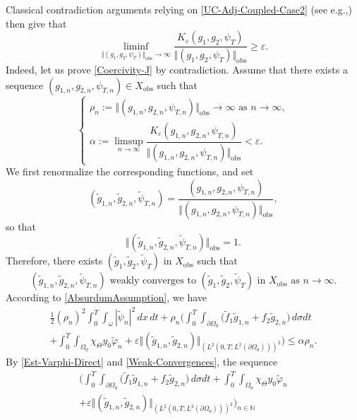 \documentclass[11pt]{article}
\newcommand{\eg}{e.g.,\xspace}
\numberwithin{equation}{section}
\newcommand{\obs}{\mathrm{obs}}
\newcommand\N{{\mathbb N}}
\newcommand{\norm}[1]{\Vert#1\Vert}
\theoremstyle{definition}
\begin{document}
Classical contradiction arguments relying on \eqref{UC-Adj-Coupled-Case2} (see \eg \cite{Ervedoza-Note-2020}) then give that
\begin{equation}
\label{Coercivity-J}
\liminf_{\norm{(g_1, g_2, \psi_T)}_{\obs} \to \infty} \frac{K_\varepsilon(g_1, g_2, \psi_T) }{\norm{(g_1, g_2, \psi_T)}_{\obs}} \geq \varepsilon.
\end{equation}
Indeed, let us prove \eqref{Coercivity-J} by contradiction. Assume that there exists a sequence $(g_{1,n}, g_{2,n}, \psi_{T,n}) \in X_{\obs}$ such that
\begin{equation}
\label{AbsurdumAssumption}
\begin{cases}
\rho_n := \norm{(g_{1,n}, g_{2,n}, \psi_{T,n})}_{\obs} \to \infty \text{ as } n \to \infty,\\[3pt]
\alpha:=\limsup_{n \to \infty} \dfrac{K_\varepsilon(g_{1,n}, g_{2,n}, \psi_{T,n})}{\norm{(g_{1,n}, g_{2,n}, \psi_{T,n})}_{\obs}} < \varepsilon.
\end{cases}
\end{equation}
We first renormalize the corresponding functions, and set
\[
(\tilde g_{1,n}, \tilde g_{2,n}, \tilde \psi_{T,n}) = \frac{(g_{1,n}, g_{2,n}, \psi_{T,n})}{ \norm{(g_{1,n}, g_{2,n}, \psi_{T,n})}_{\obs}},
\]
so that
\begin{equation}
\label{Bound-tilde-n}
\norm{(\tilde g_{1,n}, \tilde g_{2,n}, \tilde \psi_{T,n}) }_{\obs} = 1.
\end{equation}
Therefore, there exists $(\tilde g_1, \tilde g_2, \tilde \psi_T)$ in $X_{\obs}$ such that
\begin{equation}
\label{Weak-Convergences}
(\tilde g_{1,n}, \tilde g_{2,n}, \tilde \psi_{T,n}) \text{ weakly converges to }(\tilde g_1, \tilde g_2, \tilde \psi_T) \text{ in } X_{\obs} \text{ as } n \to \infty.
\end{equation}
According to \eqref{AbsurdumAssumption}, we have
\begin{multline}
\label{J-eps-expanded}
\frac{1}{2}(\rho_n)^2 \int_0^T \int_\omega |\tilde \psi_n|^2 \, dx\,dt
+
\rho_n
\biggl(
\int_0^T \int_{\partial \Omega_0} \bigl(\tilde f_1 \tilde g_{1,n} + f_2 \tilde g_{2,n} \bigr) \, d\sigma dt\\
+
\int_0^T \int_{\Omega_0} \chi_{\Theta} y_0 \tilde \varphi_n
+
\varepsilon { \norm{(\tilde g_{1,n}, \tilde g_{2,n})}_{(L^2(0,T; L^2(\partial\Omega_0)))^2}
}
\biggr)
\leq \alpha \rho_n.
\end{multline}
By \eqref{Est-Varphi-Direct} and \eqref{Weak-Convergences}, the sequence
\begin{multline*}
\biggl(
\int_0^T \int_{\partial \Omega_0} \bigl(\tilde f_1 \tilde g_{1,n} + f_2 \tilde g_{2,n} \bigr) \, d\sigma dt
+
\int_0^T \int_{\Omega_0} \chi_{\Theta} y_0 \tilde \varphi_n\\[-10pt]
+
\varepsilon
{ \norm{(\tilde g_{1,n}, \tilde g_{2,n})}_{(L^2(0,T; L^2(\partial\Omega_0)))^2}}
\biggr)_{n \in \N}
\end{multline*}
\end{document}
